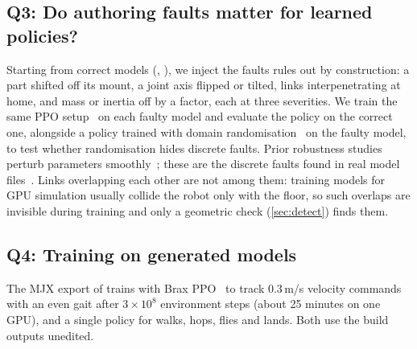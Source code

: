 \subsection{Q3: Do authoring faults matter for learned policies?}
\label{sec:faults}
 Starting from correct models (, ), we inject the
faults \ms rules out by construction: a part shifted off its mount, a joint axis flipped or tilted,
links interpenetrating at home, and mass or inertia off by a factor, each at three severities. We
train the same PPO setup~\citep{rudin2021legged,schulman2017ppo} on each faulty model and evaluate
the policy on the correct one, alongside a policy trained with domain
randomisation~\citep{peng2018dynrand} on the faulty model, to test whether randomisation hides
discrete faults. Prior robustness studies perturb parameters smoothly~\citep{exarchos2021kinematic,campanaro2024erfi};
these are the discrete faults found in real model files~\citep{tola2024urdf}. Links overlapping each other
are not among them: training models for GPU simulation usually collide the robot only with the
floor, so such overlaps are invisible during training and only a geometric check
(\cref{sec:detect}) finds them.

\subsection{Q4: Training on generated models}
\label{sec:rl}
The MJX export of  trains with Brax PPO~\citep{freeman2021brax,schulman2017ppo}
to track 0.3\,m/s velocity commands with an even gait after $3\times10^8$ environment steps
(about 25 minutes on one GPU), and a single policy for  walks, hops,
flies and lands. Both use the build outputs unedited.
